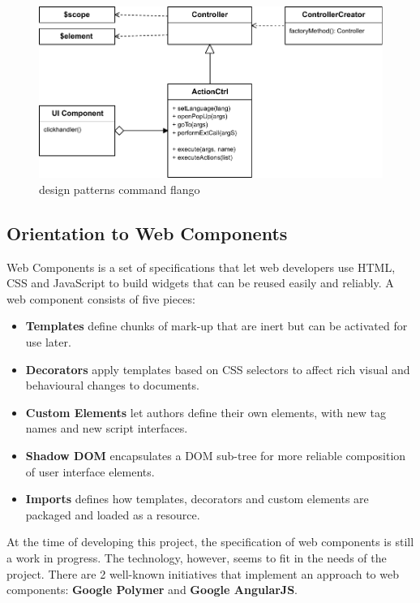 \begin{figure}[htb]
    \centering
    \includegraphics{figures/design-patterns-command-flango.pdf}
    \caption{design patterns command flango}
    \label{fig:design-command-flango}
\end{figure}

\subsection{Orientation to Web Components}
Web Components is a set of specifications that let web developers use \ac{HTML}, \ac{CSS} and JavaScript to build widgets that can be reused easily and reliably.
A web component consists of five pieces\cite{W3CComponents:2013}:
\begin{itemize}
    \item \textbf{Templates} define chunks of mark-up that are inert but can be activated for use later.
    \item \textbf{Decorators} apply templates based on CSS selectors to affect rich visual and behavioural changes to documents.
    \item \textbf{Custom Elements} let authors define their own elements, with new tag names and new script interfaces.
    \item \textbf{Shadow DOM}  encapsulates a DOM sub-tree for more reliable composition of user interface elements.
    \item \textbf{Imports} defines how templates, decorators and custom elements are packaged and loaded as a resource.
\end{itemize}

At the time of developing this project, the specification of web components is still a work in progress.
The technology, however, seems to fit in the needs of the project.
There are 2 well-known initiatives that implement an approach to web components: \textbf{Google Polymer} and \textbf{Google AngularJS}.

